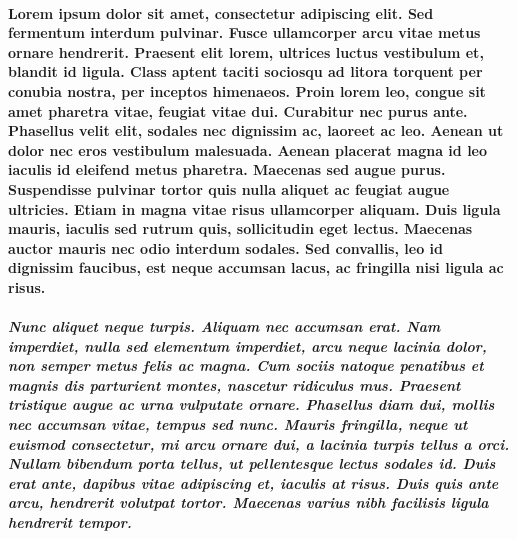\documentclass[titlepage,norsk]{article}
\begin{document}
\paragraph{Lorem ipsum dolor sit amet, consectetur adipiscing elit. Sed fermentum interdum pulvinar. Fusce ullamcorper arcu vitae metus ornare hendrerit. Praesent elit lorem, ultrices luctus vestibulum et, blandit id ligula. Class aptent taciti sociosqu ad litora torquent per conubia nostra, per inceptos himenaeos. Proin lorem leo, congue sit amet pharetra vitae, feugiat vitae dui. Curabitur nec purus ante.
Phasellus velit elit, sodales nec dignissim ac, laoreet ac leo. Aenean ut dolor nec eros vestibulum malesuada. Aenean placerat magna id leo iaculis id eleifend metus pharetra. Maecenas sed augue purus. Suspendisse pulvinar tortor quis nulla aliquet ac feugiat augue ultricies. Etiam in magna vitae risus ullamcorper aliquam. Duis ligula mauris, iaculis sed rutrum quis, sollicitudin eget lectus. Maecenas auctor mauris nec odio interdum sodales. Sed convallis, leo id dignissim faucibus, est neque accumsan lacus, ac fringilla nisi ligula ac risus.
}


\subparagraph{Nunc aliquet neque turpis. Aliquam nec accumsan erat. Nam imperdiet, nulla sed elementum imperdiet, arcu neque lacinia dolor, non semper metus felis ac magna. Cum sociis natoque penatibus et magnis dis parturient montes, nascetur ridiculus mus. Praesent tristique augue ac urna vulputate ornare. Phasellus diam dui, mollis nec accumsan vitae, tempus sed nunc. Mauris fringilla, neque ut euismod consectetur, mi arcu ornare dui, a lacinia turpis tellus a orci. Nullam bibendum porta tellus, ut pellentesque lectus sodales id. Duis erat ante, dapibus vitae adipiscing et, iaculis at risus. Duis quis ante arcu, hendrerit volutpat tortor. Maecenas varius nibh facilisis ligula hendrerit tempor.
}
\end{document}

